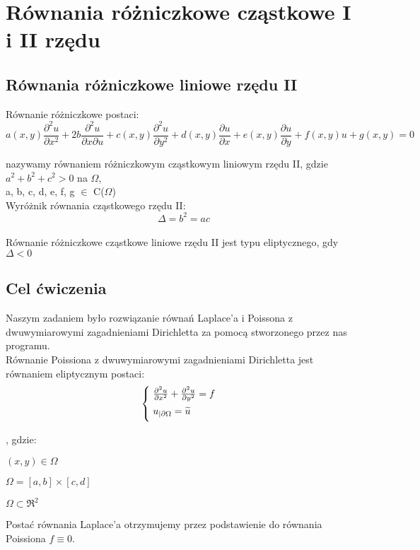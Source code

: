 \section{Równania różniczkowe cząstkowe I i II rzędu}
\subsection{Równania różniczkowe liniowe rzędu II}
Równanie różniczkowe postaci:
$$ a(x,y) \dfrac{\partial^2u}{\partial x^2} + 2b \dfrac{\partial ^2u}{\partial x \partial u} + c(x,y)\dfrac{\partial^2u}{\partial y^2} + d(x,y) \dfrac{\partial u}{\partial x} + e(x,y) \dfrac{\partial u}{\partial y} + f(x,y) u + g(x,y) = 0$$

nazywamy równaniem różniczkowym cząstkowym liniowym rzędu II, gdzie $a^2 + b^2 + c^2>0$ na $\Omega$,\\ a, b, c, d, e, f, g $\in$ C($\Omega$)
\\
Wyróżnik równania cząstkowego rzędu II:
$$\Delta = b^2 = ac$$\\
Równanie różniczkowe cząstkowe liniowe rzędu II jest typu eliptycznego, gdy $\Delta < 0$
\newpage
\subsection{Cel ćwiczenia}
Naszym zadaniem było rozwiązanie równań Laplace'a i Poissona z dwuwymiarowymi zagadnieniami Dirichletta za pomocą stworzonego przez nas programu.
\\
Równanie Poissiona z dwuwymiarowymi zagadnieniami Dirichletta jest równaniem eliptycznym postaci:
\[
\begin{cases}
\vspace{0.1cm} 
\hspace{0,1cm}\frac{\partial^2 u}{\partial x^2} + \frac{\partial^2 u}{\partial y^2} = f\\
\vspace{0.1cm}
\hspace{0,1cm}u_{|\partial \Omega} = \widetilde{u} \\
\end{cases}
\]

, gdzie:

$(x,y) \in \Omega$

$\Omega = [a,b] \times [c,d]$

$\Omega \subset \Re^2$

Postać równania Laplace'a otrzymujemy przez podstawienie do równania Poissiona $f \equiv 0$. \\


